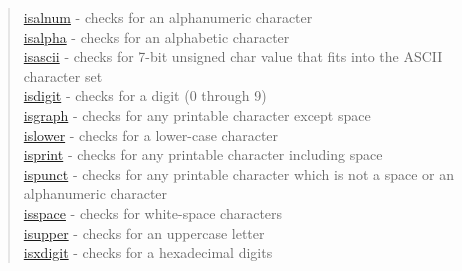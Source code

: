 \begin{quote}
\noindent
\hyperlink{isalnum}{isalnum} - checks for an alphanumeric character\\
\hyperlink{isalpha}{isalpha} - checks for an alphabetic character\\
\hyperlink{isascii}{isascii} - checks for 7-bit unsigned char value that fits into the ASCII character set\\
\hyperlink{isdigit}{isdigit} - checks for a digit (0 through 9)\\
\hyperlink{isgraph}{isgraph} - checks for any printable character except space\\
\hyperlink{islower}{islower} - checks for a lower-case character\\
\hyperlink{isprint}{isprint} - checks for any printable character including space\\
\hyperlink{ispunct}{ispunct} - checks for any printable character which is not a space or an alphanumeric character\\
\hyperlink{isspace}{isspace} - checks for white-space characters\\
\hyperlink{isupper}{isupper} - checks for an uppercase letter\\
\hyperlink{isxdigit}{isxdigit} - checks for a hexadecimal digits\\
\end{quote}



















